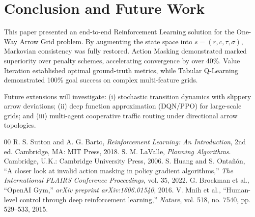 \documentclass[conference]{IEEEtran}
\begin{document}
\section{Conclusion and Future Work}
This paper presented an end-to-end Reinforcement Learning solution for the One-Way Arrow Grid problem. By augmenting the state space into $s = (r, c, \tau, \sigma)$, Markovian consistency was fully restored. Action Masking demonstrated marked superiority over penalty schemes, accelerating convergence by over 40\%. Value Iteration established optimal ground-truth metrics, while Tabular Q-Learning demonstrated 100\% goal success on complex multi-feature grids.

Future extensions will investigate: (i) stochastic transition dynamics with slippery arrow deviations; (ii) deep function approximation (DQN/PPO) for large-scale grids; and (iii) multi-agent cooperative traffic routing under directional arrow topologies.

\begin{thebibliography}{00}
 R. S. Sutton and A. G. Barto, \textit{Reinforcement Learning: An Introduction}, 2nd ed. Cambridge, MA: MIT Press, 2018.
 S. M. LaValle, \textit{Planning Algorithms}. Cambridge, U.K.: Cambridge University Press, 2006.
 S. Huang and S. Onta{\~n}{\'o}n, ``A closer look at invalid action masking in policy gradient algorithms,'' \textit{The International FLAIRS Conference Proceedings}, vol. 35, 2022.
 G. Brockman et al., ``OpenAI Gym,'' \textit{arXiv preprint arXiv:1606.01540}, 2016.
 V. Mnih et al., ``Human-level control through deep reinforcement learning,'' \textit{Nature}, vol. 518, no. 7540, pp. 529--533, 2015.
\end{thebibliography}
\end{document}
